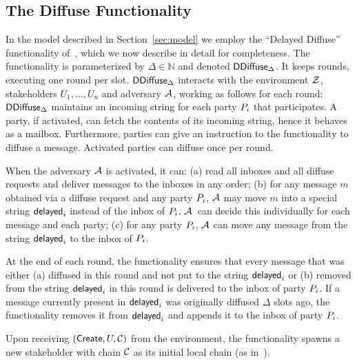 \subsection{The Diffuse Functionality}
\label{diffuse}


In the model described in Section~\ref{sec:model} we employ the
``Delayed Diffuse'' functionality of~\cite{praos}, which we now describe
in detail for completeness.
The functionality is para\-meterized by $\Delta\in\mathbb{N}$ and
denoted {$\mathsf{DDiffuse}_\Delta$}. It keeps rounds, executing one round per slot.
{$\mathsf{DDiffuse}_\Delta$} interacts with the environment $\mathcal{Z}$, stakeholders
$U_1,\ldots,U_n$ and adversary $\mathcal{A}$,
working as follows for each
round:
  {$\mathsf{DDiffuse}_\Delta$} maintains an incoming string for each party $P_i$ that participates. A party,
if activated, can fetch the contents of its incoming
string, hence it behaves as a mailbox. Furthermore, parties can give
an instruction to the functionality to diffuse a message. Activated parties can diffuse once per round.

  When the adversary $\mathcal{A}$ is activated,
  it can:
    (a) read all
    inboxes and all diffuse requests and deliver messages to the inboxes in any
    order;
    (b) for any message $m$ obtained via a diffuse request and any party $P_i$,
      $\mathcal{A}$ may move $m$ into a special string $\mathsf{delayed}_i$ instead of the
      inbox of $P_i$. $\mathcal{A}$~can decide this individually for each message and
      each party;
    (c) for any party $P_i$, $\mathcal{A}$ can move any message from the string
      $\mathsf{delayed}_i$ to the inbox of $P_i$.

  At the end of each round, the functionality ensures that every message
  that was either (a) diffused in this round and not put to the string
  $\mathsf{delayed}_i$  or (b) removed from the string $\mathsf{delayed}_i$ in this round
  is delivered to the inbox of  party $P_i$.
  If a message currently present in $\mathsf{delayed}_i$ was
  originally diffused $\Delta$ slots ago, the functionality
  removes it from $\mathsf{delayed}_i$ and appends it to the inbox of party $P_i$.

    Upon receiving $(\mathsf{Create},U,\mathcal{C})$ from the environment, the
    functionality spawns a new stakeholder with chain $\mathcal{C}$ as its initial
    local chain (as in~\cite{ouroboros,praos}).
